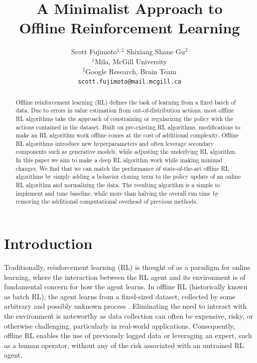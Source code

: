\documentclass{article}
\title{A Minimalist Approach to\\Offline Reinforcement Learning}
\author{
Scott Fujimoto$^{1,2}$ \qquad Shixiang Shane Gu$^2$ \\
$^1$Mila, McGill University \\
$^2$Google Research, Brain Team \\
\texttt{scott.fujimoto@mail.mcgill.ca}
}
\begin{document}
\maketitle

\begin{abstract}
Offline reinforcement learning (RL) defines the task of learning from a fixed batch of data. Due to errors in value estimation from out-of-distribution actions, most offline RL algorithms take the approach of constraining or regularizing the policy with the actions contained in the dataset. Built on pre-existing RL algorithms, modifications to make an RL algorithm work offline comes at the cost of additional complexity. Offline RL algorithms introduce new hyperparameters and often leverage secondary components such as generative models, while adjusting the underlying RL algorithm. In this paper we aim to make a deep RL algorithm work while making minimal changes. We find that we can match the performance of state-of-the-art offline RL algorithms by simply adding a behavior cloning term to the policy update of an online RL algorithm and normalizing the data. The resulting algorithm is a simple to implement and tune baseline, while more than halving the overall run time by removing the additional computational overhead of previous methods. 
\end{abstract}

\section{Introduction}

Traditionally, reinforcement learning (RL) is thought of as a paradigm for online learning, where the interaction between the RL agent and its environment is of fundamental concern for how the agent learns. In offline RL (historically known as batch RL), the agent learns from a fixed-sized dataset, collected by some arbitrary and possibly unknown process \citep{lange2012batch}. Eliminating the need to interact with the environment is noteworthy as data collection can often be expensive, risky, or otherwise challenging, particularly in real-world applications. Consequently, offline RL enables the use of previously logged data or leveraging an expert, such as a human operator, without any of the risk associated with an untrained RL agent. 
\end{document}
